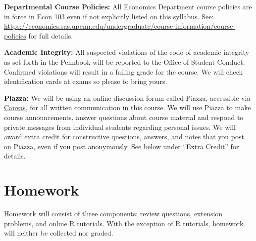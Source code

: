 \documentclass[11pt, letterpaper]{article}
\begin{document}
\newpage

\noindent \textbf{Departmental Course Policies: } 
All Economics Department course policies are in force in Econ 103 even if not explicitly listed on this syllabus. 
See: \url{https://economics.sas.upenn.edu/undergraduate/course-information/course-policies} for full details.


\bigskip


\noindent \textbf{Academic Integrity: } 
All suspected violations of the code of academic integrity as set forth in the Pennbook will be reported to the Office of Student Conduct. 
Confirmed violations will result in a failing grade for the course. 
We will check identification cards at exams so please to bring yours.

\medskip

\noindent \textbf{Piazza:} 
We will be using an online discussion forum called Piazza, accessible via \href{http://upenn.instructure.com}{Canvas}, for all written communication in this course.
We will use Piazza to make course announcements, answer questions about course material and respond to private messages from individual students regarding personal issues.
We will award extra credit for constructive questions, answers, and notes that you post on Piazza, even if you post anonymously.
See below under ``Extra Credit'' for details.

\section*{Homework}
Homework will consist of three components: review questions, extension problems, and online R tutorials. 
With the exception of R tutorials, homework will neither be collected nor graded.
\end{document}
